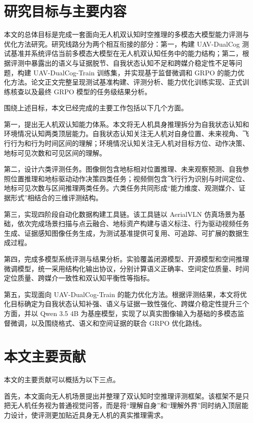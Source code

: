 \section{研究目标与主要内容}

本文的总体目标是完成一套面向无人机双认知时空推理的多模态大模型能力评测与优化方法研究。研究线路分为两个相互衔接的部分：第一，构建 UAV-DualCog 测试基准并系统评估当前多模态大模型在无人机双认知任务中的能力结构；第二，根据评测中暴露出的语义与证据脱节、自我状态认知不足和跨媒介稳定性不足等问题，构建 UAV-DualCog-Train 训练集，并实现基于监督微调和 GRPO 的能力优化方法。论文正文完整呈现测试基准构建、评测分析、能力优化训练实现、正式训练核查以及最终 GRPO 模型的任务级结果分析。

围绕上述目标，本文已经完成的主要工作包括以下几个方面。

第一，提出无人机双认知能力体系。本文将无人机具身推理拆分为自我状态认知和环境情况认知两类顶层能力。自我状态认知关注无人机对自身位置、未来视角、飞行行为和行为时间区间的理解；环境情况认知关注无人机对目标方位、动作决策、地标可见次数和可见区间的理解。

第二，设计六类评测任务。图像侧包含地标相对位置推理、未来观察预测、自我参照位置推理和地标驱动动作决策四类任务；视频侧包含飞行行为识别与时间定位、地标可见次数与区间推理两类任务。六类任务共同形成“能力维度、观测媒介、证据形式”相结合的三维评测结构。

第三，实现四阶段自动化数据构建工具链。该工具链以 AerialVLN 仿真场景为基础，依次完成场景扫描与点云融合、地标资产构建与语义标注、行为驱动视频任务生成、证据感知图像任务生成，为测试基准提供可复用、可追踪、可扩展的数据生成过程。

第四，完成多模型系统评测与结果分析。实验覆盖闭源模型、开源模型和空间推理微调模型，统一采用结构化输出协议，分别计算语义正确率、空间定位质量、时间定位质量、跨媒介一致性和双认知平衡性等指标。

第五，实现面向 UAV-DualCog-Train 的能力优化方法。根据评测结果，本文将优化目标确定为自我状态认知补强、语义与证据一致性强化、跨媒介稳定性提升三个方面，并以 Qwen 3.5 4B 为基座模型，实现了以真实图像输入为基础的多模态监督微调，以及围绕格式、语义和空间证据的联合 GRPO 优化路线。

\section{本文主要贡献}

本文的主要贡献可以概括为以下三点。

首先，本文面向无人机场景提出并整理了双认知时空推理评测框架。该框架不是只把无人机任务视为普通视觉问答，而是将“理解自身”和“理解外界”同时纳入顶层能力设计，使评测更加贴近具身无人机的真实推理需求。

